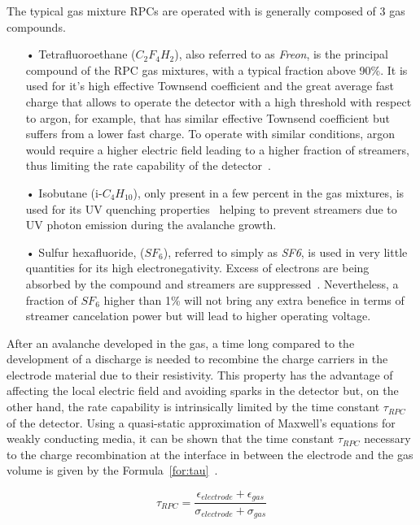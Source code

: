 	The typical gas mixture RPCs are operated with is generally composed of 3 gas compounds.
	
	\begin{itemize}
		\item[•] Tetrafluoroethane ($C_2F_4H_2$), also referred to as \textit{Freon}, is the principal compound of the RPC gas mixtures, with a typical fraction above 90\%. It is used for it's high effective Townsend coefficient and the great average fast charge that allows to operate the detector with a high threshold with respect to argon, for example, that has similar effective Townsend coefficient but suffers from a lower fast charge. To operate with similar conditions, argon would require a higher electric field leading to a higher fraction of streamers, thus limiting the rate capability of the detector~\cite{ABBRESCIA1997}.
		\item[•] Isobutane (i-$C_4H_{10}$), only present in a few percent in the gas mixtures, is used for its UV quenching properties~\cite{BATTISTONI85} helping to prevent streamers due to UV photon emission during the avalanche growth.
		\item[•] Sulfur hexafluoride, ($SF_6$), referred to simply as \textit{SF6}, is used in very little quantities for its high electronegativity. Excess of electrons are being absorbed by the compound and streamers are suppressed~\cite{ZEBALLOS98}. Nevertheless, a fraction of $SF_6$ higher than 1\% will not bring any extra benefice in terms of streamer cancelation power but will lead to higher operating voltage.
	\end{itemize}
	
	After an avalanche developed in the gas, a time long compared to the development of a discharge is needed to recombine the charge carriers in the electrode material due to their resistivity. This property has the advantage of affecting the local electric field and avoiding sparks in the detector but, on the other hand, the rate capability is intrinsically limited by the time constant $\tau_{RPC}$ of the detector. Using a quasi-static approximation of Maxwell’s equations for weakly conducting media, it can be shown that the time constant $\tau_{RPC}$ necessary to the charge recombination at the interface in between the electrode and the gas volume is given by the Formula~\ref{for:tau}~\cite{RIEGLER2002}.
	
	\begin{equation}
		\label{for:tau}
		\tau_{RPC} = \frac{\epsilon_{electrode}+\epsilon_{gas}}{\sigma_{electrode}+\sigma_{gas}}
	\end{equation}
	
